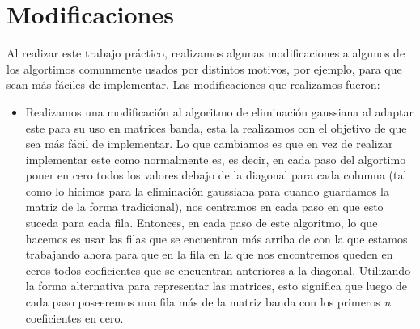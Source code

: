 \documentclass[10pt, a4paper]{article}
\begin{document}
\section{Modificaciones}
Al realizar este trabajo pr\'actico, realizamos algunas modificaciones a algunos de los algortimos comunmente usados por distintos motivos, por ejemplo, para que sean m\'as f\'aciles de implementar. Las modificaciones que realizamos fueron:
\begin{itemize}
\item Realizamos una modificaci\'on al algoritmo de eliminaci\'on gaussiana al adaptar este para su uso en matrices banda, esta la realizamos con el objetivo de que sea m\'as f\'acil de implementar. Lo que cambiamos es que en vez de realizar implementar este como normalmente es, es decir, en cada paso del algortimo poner en cero todos los valores debajo de la diagonal para cada columna (tal como lo hicimos para la eliminaci\'on gaussiana para cuando guardamos la matriz de la forma tradicional), nos centramos en cada paso en que esto suceda para cada fila. Entonces, en cada paso de este algoritmo, lo que hacemos es usar las filas que se encuentran m\'as arriba de con la que estamos trabajando ahora para que en la fila en la que nos encontremos queden en ceros todos coeficientes que se encuentran anteriores a la diagonal. Utilizando la forma alternativa para representar las matrices, esto significa que luego de cada paso poseeremos una fila m\'as de la matriz banda con los primeros \textit{n} coeficientes en cero.
\end{itemize}
\end{document}
